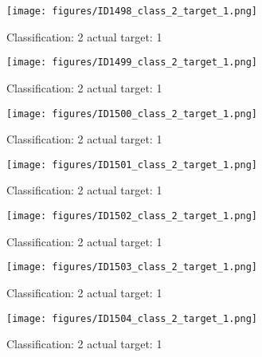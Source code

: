 \begin{figure}[h!]
\begin{center}
\texttt{[image: figures/ID1498\_class\_2\_target\_1.png]}
\end{center}
\caption{ Classification: 2 actual target: 1}
\label{fig:ID1498_class_2_target_1}
\end{figure}
\begin{figure}[h!]
\begin{center}
\texttt{[image: figures/ID1499\_class\_2\_target\_1.png]}
\end{center}
\caption{ Classification: 2 actual target: 1}
\label{fig:ID1499_class_2_target_1}
\end{figure}
\begin{figure}[h!]
\begin{center}
\texttt{[image: figures/ID1500\_class\_2\_target\_1.png]}
\end{center}
\caption{ Classification: 2 actual target: 1}
\label{fig:ID1500_class_2_target_1}
\end{figure}
\begin{figure}[h!]
\begin{center}
\texttt{[image: figures/ID1501\_class\_2\_target\_1.png]}
\end{center}
\caption{ Classification: 2 actual target: 1}
\label{fig:ID1501_class_2_target_1}
\end{figure}
\begin{figure}[h!]
\begin{center}
\texttt{[image: figures/ID1502\_class\_2\_target\_1.png]}
\end{center}
\caption{ Classification: 2 actual target: 1}
\label{fig:ID1502_class_2_target_1}
\end{figure}
\begin{figure}[h!]
\begin{center}
\texttt{[image: figures/ID1503\_class\_2\_target\_1.png]}
\end{center}
\caption{ Classification: 2 actual target: 1}
\label{fig:ID1503_class_2_target_1}
\end{figure}
\begin{figure}[h!]
\begin{center}
\texttt{[image: figures/ID1504\_class\_2\_target\_1.png]}
\end{center}
\caption{ Classification: 2 actual target: 1}
\label{fig:ID1504_class_2_target_1}
\end{figure}
